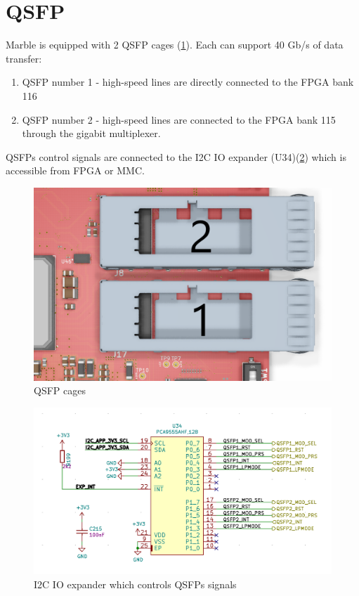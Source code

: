 \documentclass[12pt,oneside,a4]{article}
\begin{document}
\section{QSFP}
Marble is equipped with 2 QSFP cages (\ref{qsfp}). Each can support 40 Gb/s of data transfer:
\begin{enumerate}
	\item QSFP number 1 - high-speed lines are directly connected to the FPGA bank 116
	\item QSFP number 2 - high-speed lines are connected to the FPGA bank 115 through the gigabit multiplexer.
\end{enumerate}

QSFPs control signals are connected to the I2C IO expander (U34)(\ref{qsfpio}) which is accessible from FPGA or MMC.

\begin{figure}[H]
\begin{center}
\includegraphics[width=0.8\linewidth]{qsfp.png}
 \caption{QSFP cages}\label{qsfp}
\end{center}
\end{figure}

\begin{figure}[H]
\begin{center}
\includegraphics[width=0.8\linewidth]{qsfpio.png}
 \caption{I2C IO expander which controls QSFPs signals}\label{qsfpio}
\end{center}
\end{figure}
\end{document}

